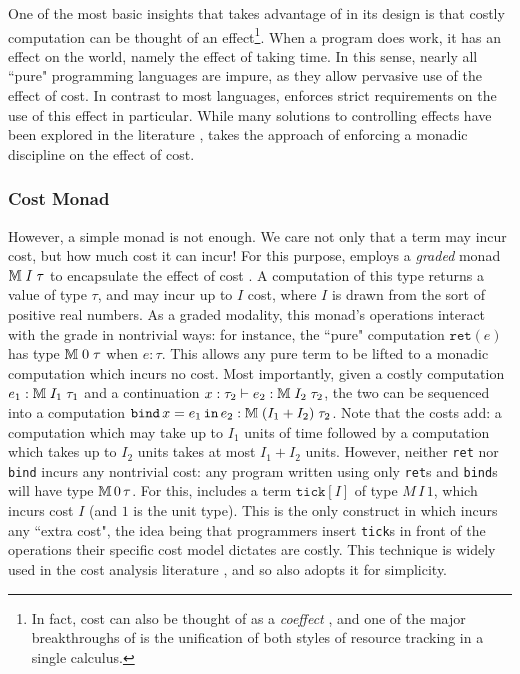 One of the most basic insights that \lambdaamor takes advantage of in its design is that costly computation can be thought of an effect\footnote{
In fact, cost can also be thought of as a \textit{coeffect} \cite{girard-et-al:tcs92:bll}, and one of the major breakthroughs of \lambdaamor is the unification
of both styles of resource tracking in a single calculus.
}. When a program does work, it has an effect on the world, namely the effect of taking time. In this sense, nearly all ``pure" programming languages are impure, as they allow pervasive use of the effect of cost. In contrast to most languages, \lambdaamor enforces strict requirements on the use of this effect in particular. While many solutions to controlling effects have been explored in the literature \citehere, \lambdaamor takes the approach of enforcing a monadic \cite{moggi91} discipline on the effect of cost.

\subsubsection{Cost Monad}
However, a simple monad is not enough. We care not only that a term may incur cost, but how much cost it can incur! For this purpose, \lambdaamor employs a \textit{graded} monad $\mathbb{M} \; I \; \tau$ to encapsulate the effect of cost \cite{gaboardi-et-al:icfp16}. A computation of this type returns a value of type $\tau$, and may incur up to $I$ cost, where $I$ is drawn from the sort of positive real numbers. As a graded modality, this monad's operations interact with the grade in nontrivial ways: for instance, the ``pure" computation $\texttt{ret}(e)$ has type $\mathbb{M} \; 0 \; \tau$ when $e : \tau$. This allows any pure term to be lifted to a monadic computation which incurs no cost. Most importantly, given a costly computation $e_1 : \mathbb{M} \; I_1 \; \tau_1$ and a continuation $x : \tau_2 \vdash e_2 : \mathbb{M} \; I_2 \; \tau_2$, the two can be sequenced into a computation $\texttt{bind}\, x = e_1\, \texttt{in}\, e_2 : \mathbb{M} \; (I_1 + I_2) \; \tau_2$. Note that the costs add: a computation which may take up to $I_1$ units of time followed by a computation which takes up to $I_2$ units takes at most $I_1 + I_2$ units. However, neither \texttt{ret} nor \texttt{bind} incurs any nontrivial cost: any program written using only \texttt{ret}s and \texttt{bind}s will have type $\mathbb{M} \, 0 \, \tau$. For this, \lambdaamor includes a term $\texttt{tick}[I]$ of type $M \, I \, 1$, which incurs cost $I$ (and $1$ is the unit type). This is the only construct in \lambdaamor which incurs any ``extra cost", the idea being that programmers insert \texttt{tick}s in front of the operations their specific cost model dictates are costly. This technique is widely used in the cost analysis literature \cite{danielsson:popl08}, and so \lambdaamor also adopts it for simplicity.
 
